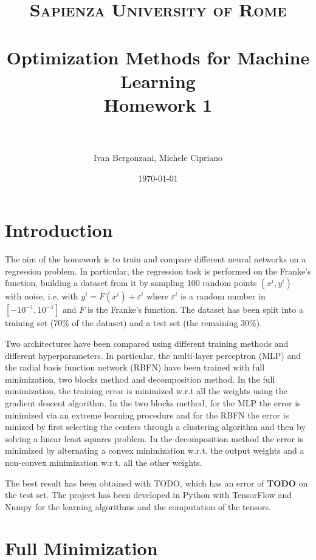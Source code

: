 \documentclass[a4paper]{article}
\title{
\normalfont \normalsize
\textsc{Sapienza University of Rome} \\ [25pt] %
\horrule{0.5pt} \\[0.4cm] %
\huge Optimization Methods for Machine Learning \\ %
\large Homework 1 \\
\horrule{2pt} \\[0.5cm] %
}
\author{Ivan Bergonzani, Michele Cipriano} %
\date{\normalsize\today} %
\numberwithin{equation}{section} %
\numberwithin{figure}{section} %
\numberwithin{table}{section} %
\theoremstyle{definition}
\begin{document}
\maketitle %


\section{Introduction}

The aim of the homework is to train and compare different neural networks on a
regression problem. In particular, the regression task is performed on the Franke's
function, building a dataset from it by sampling 100 random points $(x^i, y^i)$ with noise,
i.e. with $y^i = F(x^i) + \varepsilon^i$ where $\varepsilon^i$ is a random number in
$[-10^{-1}, 10^{-1}]$ and $F$ is the Franke's function.
The dataset has been split into a training set (70\% of the dataset)
and a test set (the remaining 30\%).

Two architectures have been compared using different training methods and different
hyperparameters. In particular, the multi-layer perceptron (MLP) and the radial basis
function network (RBFN) have been trained with full minimization, two blocks method
and decomposition method. In the full minimization, the training
error is minimized w.r.t all the weights using the gradient descent algorithm.
In the two blocks method, for the MLP
the error is minimized via an extreme learning procedure and for the RBFN the
error is minized by first selecting the centers through a clustering algorithm
and then by solving a linear least squares problem. In the decomposition method
the error is minimized by alternating a convex minimization w.r.t. the output
weights and a non-convex minimization w.r.t. all the other weights.

The best result has been obtained with TODO, which has an error of \textbf{TODO}
on the test set. The project has been developed in Python with TensorFlow and
Numpy for the learning algorithms and the computation of the tensors.


\section{Full Minimization}
\end{document}
